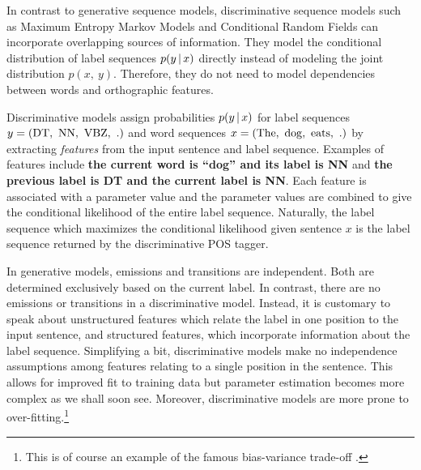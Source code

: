 In contrast to generative sequence models, discriminative sequence
models such as Maximum Entropy Markov Models \citep{Ratnaparkhi1998}
and Conditional Random Fields \citep{Lafferty2001} can incorporate
overlapping sources of information. They model the conditional
distribution of label sequences $p(y\mbox{$ \, | \, $} x)$ directly instead of
modeling the joint distribution $p(x,\ y)$. Therefore, they do not
need to model dependencies between words and orthographic features.

Discriminative models assign probabilities $p(y\mbox{$ \, | \, $} x)$ for label
sequences $y = ({\rm DT},\ {\rm NN},\ {\rm VBZ},\ {\rm .})$ and word sequences $x = ({\rm The},\ {\rm dog},\ {\rm eats},\ {\rm .})$ by extracting {\it features} from
the input sentence and label sequence. Examples of features
include {\bf the current word is ``dog'' and its label is NN} and {\bf the previous label is DT and
  the current label is NN}. Each feature is associated with a parameter value and the
parameter values are combined to give the conditional likelihood of
the entire label sequence. Naturally, the label sequence which
maximizes the conditional likelihood given sentence $x$ is the label
sequence returned by the discriminative POS tagger.

In generative models, emissions and transitions are independent. Both
are determined exclusively based on the current label. In contrast,
there are no emissions or transitions in a discriminative
model. Instead, it is customary to speak about unstructured features
which relate the label in one position to the input sentence, and
structured features, which incorporate information about the label
sequence. Simplifying a bit, discriminative models make no
independence assumptions among features relating to a single position
in the sentence. This allows for improved fit to training data but
parameter estimation becomes more complex as we shall soon
see. Moreover, discriminative models are more prone to
over-fitting.\footnote{This is of course an example of the famous bias-variance
trade-off \citep{Geman1992}.}




